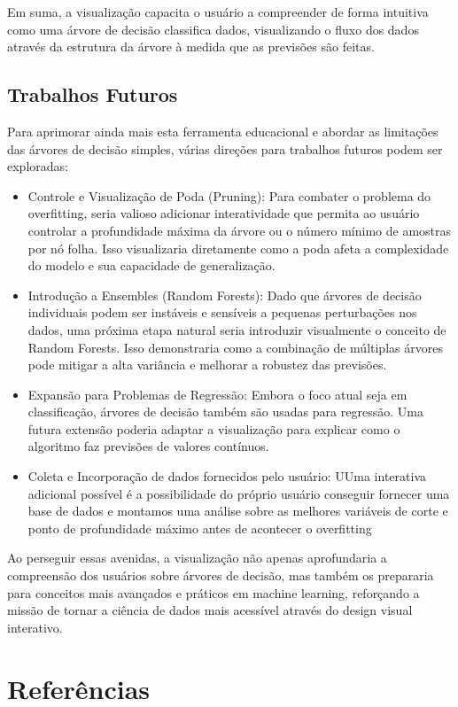\documentclass{article}
\begin{document}
Em suma, a visualização capacita o usuário a compreender de forma intuitiva como uma árvore de decisão classifica dados, 
visualizando o fluxo dos dados através da estrutura da árvore à medida que as previsões são feitas. 

\subsection*{Trabalhos Futuros}
Para aprimorar ainda mais esta ferramenta educacional e abordar as limitações das árvores de decisão simples, 
várias direções para trabalhos futuros podem ser exploradas:

\begin{itemize}
    
    
    \item Controle e Visualização de Poda (Pruning): Para combater o problema do overfitting, seria valioso adicionar 
    interatividade que permita ao usuário controlar a profundidade máxima da árvore ou o número mínimo de amostras 
    por nó folha. Isso visualizaria diretamente como a poda afeta a complexidade do modelo e sua capacidade de generalização.
    \item Introdução a Ensembles (Random Forests): Dado que árvores de decisão individuais podem ser instáveis e sensíveis a 
    pequenas perturbações nos dados, uma próxima etapa natural seria introduzir visualmente o conceito de Random Forests. 
    Isso demonstraria como a combinação de múltiplas árvores pode mitigar a alta variância e melhorar a robustez das previsões.
    \item Expansão para Problemas de Regressão: Embora o foco atual seja em classificação, árvores de decisão também são usadas para regressão. Uma futura extensão poderia adaptar a visualização para explicar como o algoritmo faz previsões de valores contínuos.
    \item Coleta e Incorporação de dados fornecidos pelo usuário: UUma interativa adicional possível é a possibilidade do próprio usuário conseguir 
    fornecer uma base de dados e montamos uma análise sobre as melhores variáveis de corte e ponto de profundidade máximo antes de acontecer o overfitting
    
\end{itemize}
Ao perseguir essas avenidas, a visualização não apenas aprofundaria a compreensão dos usuários sobre árvores de decisão, mas também os prepararia para conceitos mais avançados e práticos em machine learning, reforçando a missão de tornar a ciência de dados mais acessível através do design visual interativo.

\section{Referências}
\end{document}
